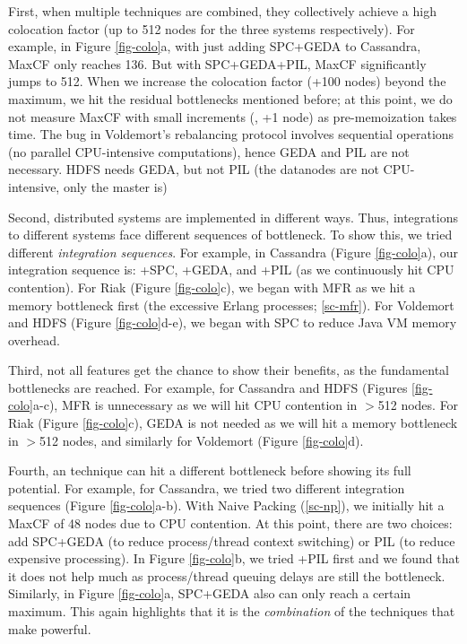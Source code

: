 First, when multiple techniques are combined, they collectively achieve a
high colocation factor (up to 512 nodes for the three
systems respectively).
%
For example, in Figure \ref{fig-colo}a, with just adding SPC+GEDA to
Cassandra, MaxCF only reaches 136.  But with SPC+GEDA+PIL, MaxCF
significantly jumps to 512.
%
When we increase the colocation factor (+100 nodes) beyond the maximum, we
hit the residual bottlenecks mentioned before; at this point, we do not
measure MaxCF with small increments (\eg, +1 node) as pre-memoization takes
time.
%
The bug in Voldemort's rebalancing protocol involves sequential
operations (no parallel CPU-intensive computations), hence GEDA and PIL
are not necessary.  HDFS needs GEDA, but not PIL (the datanodes are not
CPU-intensive, only the master is)






Second, distributed systems are implemented in different ways.
Thus, integrations to different systems face different sequences of
bottleneck.  To show this, we tried different {\em integration sequences}.
For example, 
in Cassandra (Figure \ref{fig-colo}a),
our integration sequence is: +SPC, +GEDA, and +PIL (as we continuously hit
CPU contention).
%
For Riak (Figure \ref{fig-colo}c), we began with MFR as we hit
a memory bottleneck first (the excessive Erlang processes;
\sec\ref{sc-mfr}).
For Voldemort and HDFS (Figure \ref{fig-colo}d-e), we began with SPC to
reduce Java VM memory overhead.



Third, not all features get the chance to show their benefits, as the
fundamental bottlenecks are reached.  For example, for Cassandra and HDFS
(Figures \ref{fig-colo}a-c), MFR is unnecessary as we will hit CPU
contention in $>$512 nodes.  For Riak (Figure \ref{fig-colo}c),
GEDA is not needed as we will hit a memory bottleneck in $>$512 nodes, and
similarly for Voldemort (Figure \ref{fig-colo}d).




Fourth, an \sck technique can hit a different bottleneck before showing
its full potential.  For example, for Cassandra, we tried two different
integration sequences (Figure \ref{fig-colo}a-b).  With Naive Packing
(\sec\ref{sc-np}), we initially hit a MaxCF of 48 nodes due to CPU
contention.  At this point, there are two choices: add SPC+GEDA (to reduce
process/thread context switching) or PIL (to reduce expensive processing).
In Figure \ref{fig-colo}b, we tried +PIL first and we found that it does
not help much as process/thread queuing delays are still the bottleneck.
Similarly, in Figure \ref{fig-colo}a, SPC+GEDA also can only reach a
certain maximum.  This again highlights that it is the {\em combination}
of the techniques that make \sck powerful.

